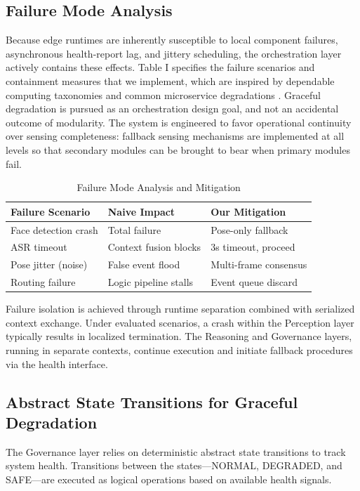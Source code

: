 \documentclass[conference]{IEEEtran}
\begin{document}
\subsection{Failure Mode Analysis}
Because edge runtimes are inherently susceptible to local component failures, asynchronous health-report lag, and jittery scheduling, the orchestration layer actively contains these effects. Table I specifies the failure scenarios and containment measures that we implement, which are inspired by dependable computing taxonomies \cite{b18} and common microservice degradations \cite{b24}. Graceful degradation is pursued as an orchestration design goal, and not an accidental outcome of modularity. The system is engineered to favor operational continuity over sensing completeness: fallback sensing mechanisms are implemented at all levels so that secondary modules can be brought to bear when primary modules fail.

\begin{table}[htbp]
\caption{Failure Mode Analysis and Mitigation}
\begin{center}
\begin{tabular}{lll}
\toprule
\textbf{Failure Scenario} & \textbf{Naive Impact} & \textbf{Our Mitigation} \\
\midrule
Face detection crash & Total failure & Pose-only fallback \\
ASR timeout & Context fusion blocks & 3s timeout, proceed \\
Pose jitter (noise) & False event flood & Multi-frame consensus \\
Routing failure & Logic pipeline stalls & Event queue discard \\
\bottomrule
\end{tabular}
\end{center}
\end{table}

Failure isolation is achieved through runtime separation combined with serialized context exchange. Under evaluated scenarios, a crash within the Perception layer typically results in localized termination. The Reasoning and Governance layers, running in separate contexts, continue execution and initiate fallback procedures via the health interface.

\subsection{Abstract State Transitions for Graceful Degradation}
The Governance layer relies on deterministic abstract state transitions to track system health. Transitions between the states—NORMAL, DEGRADED, and SAFE—are executed as logical operations based on available health signals.
\end{document}
